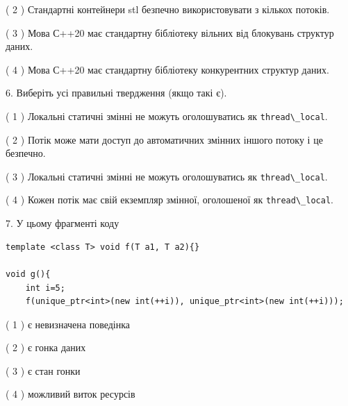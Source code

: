 \documentclass[12pt, ukrainian]{article}
\def\code#1{\Verb!#1!}
\begin{document}
\begin {large}
{( 2 ) Стандартні контейнери stl безпечно використовувати з кількох потоків.%

( 3 ) Мова С++20 має стандартну бібліотеку вільних від блокувань структур даних.%

( 4 ) Мова С++20 має стандартну бібліотеку конкурентних структур даних.%
\newpage



\vspace{5mm}
6. Виберіть усі правильні твердження (якщо такі є).\par
\vspace{2mm}

( 1 ) Локальні статичні змінні не можуть оголошуватись як \code{thread\_local}.%

( 2 ) Потік може мати доступ до автоматичних змінних іншого потоку і це безпечно.%

( 3 ) Локальні статичні змінні не можуть оголошуватись як \code{thread\_local}.%

( 4 ) Кожен потік має свій екземпляр змінної, оголошеної як \code{thread\_local}.%


\vspace{5mm}
7. У цьому фрагменті коду
\begin{verbatim}
template <class T> void f(T a1, T a2){}

void g(){
    int i=5;
    f(unique_ptr<int>(new int(++i)), unique_ptr<int>(new int(++i)));
\end{verbatim}

( 1 ) є невизначена поведінка%

( 2 ) є гонка даних%

( 3 ) є стан гонки%

( 4 ) можливий виток ресурсів%
}
\end {large}
\end{document}
